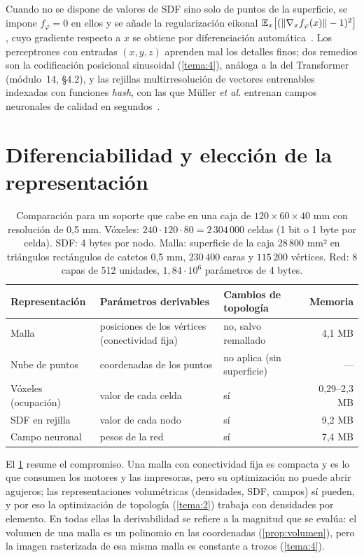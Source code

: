Cuando no se dispone de valores de SDF sino solo de puntos de la superficie, se impone $f_\varphi=0$ en ellos y se añade la regularización eikonal $\mathbb{E}_x\bigl[(\lVert\nabla_xf_\varphi(x)\rVert-1)^2\bigr]$, cuyo gradiente respecto a $x$ se obtiene por diferenciación automática~\cite{cs348nhw2}. Los perceptrones con entradas $(x,y,z)$ aprenden mal los detalles finos; dos remedios son la codificación posicional sinusoidal (\cref{tema:4}), análoga a la del Transformer (módulo~14, §4.2), y las rejillas multirresolución de vectores entrenables indexadas con funciones \emph{hash}, con las que Müller \emph{et al.} entrenan campos neuronales de calidad en segundos~\cite{ingp}.

\section{Diferenciabilidad y elección de la representación}

\begin{table}[h]
\centering\small
\begin{tabularx}{\textwidth}{@{}l>{\raggedright\arraybackslash}X>{\raggedright\arraybackslash}Xr@{}}
\toprule
Representación & Parámetros derivables & Cambios de topología & Memoria \\
\midrule
Malla & posiciones de los vértices (conectividad fija) & no, salvo remallado & 4,1 MB \\
Nube de puntos & coordenadas de los puntos & no aplica (sin superficie) & --- \\
Vóxeles (ocupación) & valor de cada celda & sí & 0,29--2,3 MB \\
SDF en rejilla & valor de cada nodo & sí & 9,2 MB \\
Campo neuronal & pesos de la red & sí & 7,4 MB \\
\bottomrule
\end{tabularx}
\caption{Comparación para un soporte que cabe en una caja de $120\times 60\times 40$ mm con resolución de 0,5 mm. Vóxeles: $240\cdot 120\cdot 80=2\,304\,000$ celdas (1 bit o 1 byte por celda). SDF: 4 bytes por nodo. Malla: superficie de la caja $28\,800$ mm² en triángulos rectángulos de catetos 0,5 mm, $230\,400$ caras y $115\,200$ vértices. Red: 8 capas de 512 unidades, $1{,}84\cdot 10^{6}$ parámetros de 4 bytes.}
\label{tab:repr}
\end{table}

El \cref{tab:repr} resume el compromiso. Una malla con conectividad fija es compacta y es lo que consumen los motores y las impresoras, pero su optimización no puede abrir agujeros; las representaciones volumétricas (densidades, SDF, campos) sí pueden, y por eso la optimización de topología (\cref{tema:2}) trabaja con densidades por elemento. En todas ellas la derivabilidad se refiere a la magnitud que se evalúa: el volumen de una malla es un polinomio en las coordenadas (\cref{prop:volumen}), pero la imagen rasterizada de esa misma malla es constante a trozos (\cref{tema:4}).

